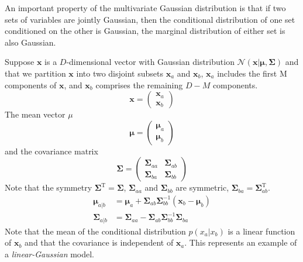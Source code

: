 \documentclass[5p,sort&compress]{elsarticle}
\begin{document}
An important property of the multivariate Gaussian distribution is that if two sets of variables are jointly Gaussian, then the conditional distribution of one set conditioned on the other is Gaussian, the marginal distribution of either set is also Gaussian.

Suppose $\boldsymbol{x}$ is a $D$-dimensional vector with Gaussian distribution $\mathcal{N}(\boldsymbol{x} | \boldsymbol{\mu}, \boldsymbol{\Sigma})$ and that we partition $\boldsymbol{x}$ into two disjoint subsets $\boldsymbol{x}_a$ and $\boldsymbol{x}_b$, $\boldsymbol{x}_a$ includes the first M components of $\boldsymbol{x}$, and $\boldsymbol{x}_b$ comprises the remaining $D-M$ components.
\begin{equation}
\boldsymbol{x}=\left(\begin{array}{l}{\boldsymbol{x}_{a}} \\ {\boldsymbol{x}_{b}}\end{array}\right)
\end{equation}
The mean vector $\mu$
\begin{equation}
\boldsymbol{\mu}=\left(\begin{array}{l}{\boldsymbol{\mu}_{a}} \\ {\boldsymbol{\mu}_{b}}\end{array}\right)
\end{equation}
and the covariance matrix
\begin{equation}
\boldsymbol{\Sigma}=\left(\begin{array}{cc}{\boldsymbol{\Sigma}_{a a}} & {\boldsymbol{\Sigma}_{a b}} \\ {\boldsymbol{\Sigma}_{b a}} & {\boldsymbol{\Sigma}_{b b}}\end{array}\right)
\end{equation}
Note that the symmetry $\boldsymbol{\Sigma}^{\mathrm{T}}=\boldsymbol{\Sigma}$, $\boldsymbol{\Sigma}_{aa}$ and $\boldsymbol{\Sigma}_{bb}$ are symmetric, $\boldsymbol{\Sigma}_{ba}=\boldsymbol{\Sigma}_{ab}^{\mathrm{T}}$.
\begin{equation}
\begin{aligned} \boldsymbol{\mu}_{a | b} &=\boldsymbol{\mu}_{a}+\boldsymbol{\Sigma}_{a b} \boldsymbol{\Sigma}_{b b}^{-1}\left(\mathbf{x}_{b}-\boldsymbol{\mu}_{b}\right) \\ \boldsymbol{\Sigma}_{a | b} &=\boldsymbol{\Sigma}_{a a}-\boldsymbol{\Sigma}_{a b} \boldsymbol{\Sigma}_{b b}^{-1} \boldsymbol{\Sigma}_{b a} \end{aligned}
\end{equation}
Note that the mean of the conditional distribution $p(x_a|x_b)$ is a linear function of $\boldsymbol{x}_b$ and that the covariance is independent of $\boldsymbol{x}_a$. This represents an example of a \textit{linear-Gaussian} model.
\end{document}
